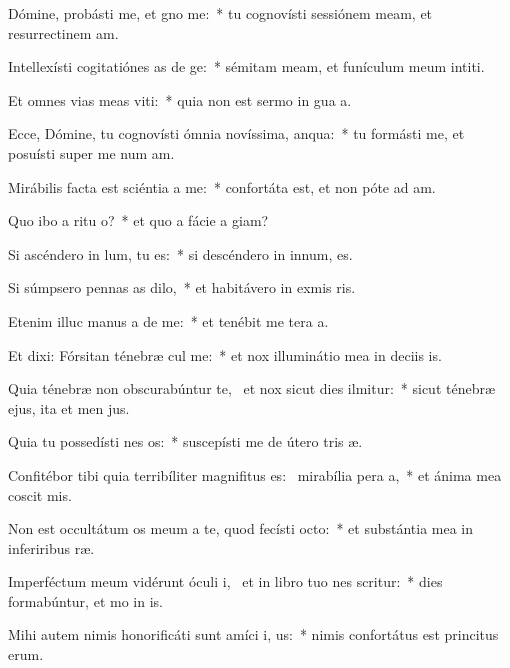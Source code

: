 \item Dómine, probásti me, et gno me:~* tu cognovísti sessiónem meam, et resurrectinem am.
\item Intellexísti cogitatiónes as de ge:~* sémitam meam, et funículum meum intiti.
\item Et omnes vias meas viti:~* quia non est sermo in gua a.
\item Ecce, Dómine, tu cognovísti ómnia novíssima,  anqua:~* tu formásti me, et posuísti super me num am.
\item Mirábilis facta est sciéntia a  me:~* confortáta est, et non póte ad am.
\item Quo ibo a ritu o?~* et quo a fácie a giam?
\item Si ascéndero in lum, tu  es:~* si descéndero in innum, es.
\item Si súmpsero pennas as dilo,~* et habitávero in exmis ris.
\item Etenim illuc manus a de me:~* et tenébit me tera a.
\item Et dixi: Fórsitan ténebræ cul me:~* et nox illuminátio mea in deciis is.
\item Quia ténebræ non obscurabúntur  te,~\pscross{} et nox sicut dies ilmitur:~* sicut ténebræ ejus, ita et men jus.
\item Quia tu possedísti nes os:~* suscepísti me de útero tris æ.
\item Confitébor tibi quia terribíliter magnifitus es:~\pscross{} mirabília pera a,~* et ánima mea coscit mis.
\item Non est occultátum os meum a te, quod fecísti  octo:~* et substántia mea in inferiribus ræ.
\item Imperféctum meum vidérunt óculi i,~\pscross{} et in libro tuo nes scritur:~* dies formabúntur, et mo in is.
\item Mihi autem nimis honorificáti sunt amíci i, us:~* nimis confortátus est princitus erum.
